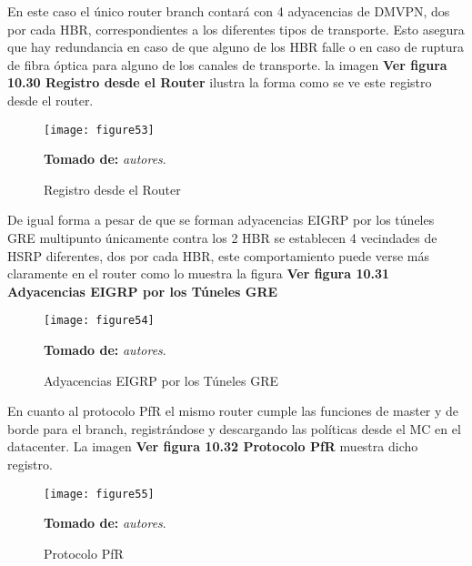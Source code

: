 En este caso el único router branch contará con 4 adyacencias de DMVPN, dos por cada HBR, correspondientes a los diferentes tipos de transporte. Esto asegura que hay redundancia en caso de que alguno de los HBR falle o en caso de ruptura de fibra óptica para alguno de los canales de transporte. la imagen \textbf{Ver figura 10.30 Registro desde el Router} ilustra la forma como se ve este registro desde el router.

\begin{figure}[htbp]
  \centering
    {\texttt{[image: figure53]}}%
  \caption{  Registro desde el Router}
  \textbf{Tomado de:} \textit{autores}.
  \label{fig:fig2subfig}
\end{figure}

De igual forma a pesar de que se forman adyacencias EIGRP por los túneles GRE multipunto únicamente contra los 2 HBR se establecen 4 vecindades de HSRP diferentes, dos por cada HBR, este comportamiento puede verse más claramente en el router como lo muestra la figura \textbf{Ver figura 10.31 Adyacencias EIGRP por los Túneles GRE}

\begin{figure}[htbp]
  \centering
    {\texttt{[image: figure54]}}%
  \caption{  Adyacencias EIGRP por los Túneles GRE}
  \textbf{Tomado de:} \textit{autores}.
  \label{fig:fig2subfig}
\end{figure}

En cuanto al protocolo PfR el mismo router cumple las funciones de master y de borde para el branch, registrándose y descargando las políticas desde el MC en el datacenter. La imagen \textbf{Ver figura 10.32  Protocolo PfR} muestra dicho registro.

\begin{figure}[htbp]
  \centering
    {\texttt{[image: figure55]}}%
  \caption{  Protocolo PfR}
  \textbf{Tomado de:} \textit{autores}.
  \label{fig:fig2subfig}
\end{figure}
